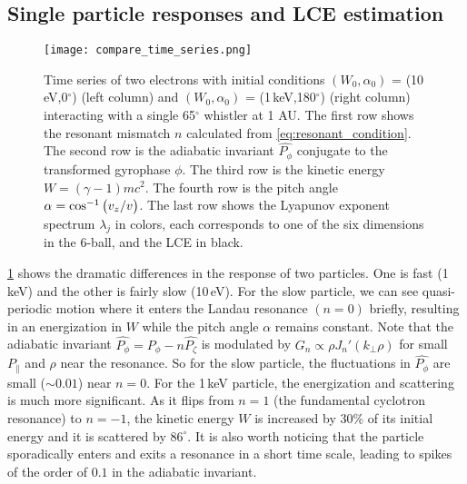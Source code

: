 
\subsection{Single particle responses and LCE estimation}

\begin{figure}[hbtp]
    \centering
    \texttt{[image: compare\_time\_series.png]}
    \caption{Time series of two electrons with initial conditions
    $(W_0,\alpha_0)$ = (10\,\si{eV},0$^\circ$) (left column) and
    $(W_0,\alpha_0)$ = (1\,\si{keV},180$^\circ$) (right column) interacting with
a single 65$^\circ$ whistler at 1 AU. The first row shows the resonant mismatch
$n$ calculated from \cref{eq:resonant_condition}. The second row is the
adiabatic invariant $\hat{P_\phi}$ conjugate to the transformed gyrophase
$\phi$. The third row is the kinetic energy $W=(\gamma-1)mc^2$. The fourth row
is the pitch angle $\alpha=\cos^{-1}\qty(v_z/v)$. The last row shows the
Lyapunov exponent spectrum $\lambda_j$ in colors, each corresponds to one of
the six dimensions in the 6-ball, and the LCE in black.}
    \label{fig:compare_time_series}
\end{figure}

\cref{fig:compare_time_series} shows the dramatic differences in the response of
two particles. One is fast (1\,\si{keV}) and the other is fairly slow
(10\,\si{eV}).  For the slow particle, we can see quasi-periodic motion where it
enters the Landau resonance $(n=0)$ briefly, resulting in an energization in $W$
while the pitch angle $\alpha$ remains constant. Note that the adiabatic
invariant $\hat{P_\phi}=P_\phi-n\hat{P_\zeta}$ is modulated by $G_n\propto
\rho J_n'(k_\bot\rho)$ for small $P_\|$ and $\rho$ near the resonance. So for
the slow particle, the fluctuations in $\hat{P_\phi}$ are small ($\sim0.01$)
near $n=0$. For the 1\,\si{keV} particle, the energization and scattering is
much more significant. As it flips from $n=1$ (the fundamental cyclotron
resonance) to $n=-1$, the kinetic energy $W$ is increased by 30\% of its initial energy and it is scattered by $86^\circ$. It is also worth noticing that the particle sporadically enters and exits a resonance in a short time scale, leading to spikes of the order of $0.1$ in the adiabatic invariant.


